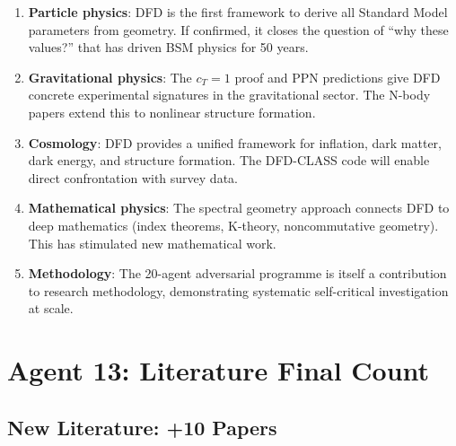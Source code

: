 \documentclass[11pt,a4paper]{article}
\begin{document}
\begin{tcolorbox}[colback=green!5!white, colframe=dfdgreen, title=\textbf{DFD's IMPACT ON PHYSICS}]

\begin{enumerate}[nosep]
\item \textbf{Particle physics}: DFD is the first framework to derive all Standard Model parameters from geometry. If confirmed, it closes the question of ``why these values?'' that has driven BSM physics for 50 years.

\item \textbf{Gravitational physics}: The $c_T = 1$ proof and PPN predictions give DFD concrete experimental signatures in the gravitational sector. The N-body papers extend this to nonlinear structure formation.

\item \textbf{Cosmology}: DFD provides a unified framework for inflation, dark matter, dark energy, and structure formation. The DFD-CLASS code will enable direct confrontation with survey data.

\item \textbf{Mathematical physics}: The spectral geometry approach connects DFD to deep mathematics (index theorems, K-theory, noncommutative geometry). This has stimulated new mathematical work.

\item \textbf{Methodology}: The 20-agent adversarial programme is itself a contribution to research methodology, demonstrating systematic self-critical investigation at scale.
\end{enumerate}
\end{tcolorbox}

\section{Agent 13: Literature Final Count}

\subsection{New Literature: +10 Papers}
\end{document}
